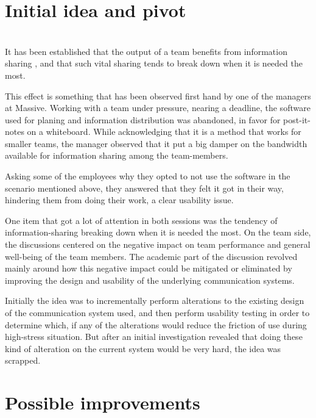 \section{Initial idea and pivot}

   \\
  It has been established that the output of a team benefits from information
  sharing\cite{%
  citeInformationSharingTeamPerformanceMeta,%
  citeContextualizedRelationshipBetweenKnowledgeSharingandPerformanceinSoftwareDevelopment%
  }
  , and that such vital sharing tends to break down when it is needed
  the most\cite{citeInformationSharingTeamPerformanceMeta}.

  This effect is something that has been observed first hand by one of the
  managers at Massive. Working with a team under pressure, nearing a deadline,
  the software used for planing and information distribution was abandoned, in
  favor for post-it-notes on a whiteboard. While acknowledging that it is a
  method that works for smaller teams, the manager observed that it put a big
  damper on the bandwidth available for information sharing among the
  team-members.

  Asking some of the employees why they opted to not use the software in the scenario
  mentioned above, they answered that they felt it got in their way, hindering
  them from doing their work, a clear usability issue.

  One item that got a lot of attention in both sessions was the tendency of
  information-sharing breaking down when it is needed the most. On the team
  side, the discussions centered on the negative impact on team performance and
  general well-being of the team members. The academic part of the discussion
  revolved mainly around how this negative impact could be mitigated or
  eliminated by improving the design and usability of the underlying
  communication systems.

  Initially the idea was to incrementally perform alterations to the existing
  design of the communication system used, and then perform usability testing in
  order to determine which, if any of the alterations would reduce the friction
  of use during high-stress situation. But after an initial investigation
  revealed that doing these kind of alteration on the current system would be
  very hard, the idea was scrapped.


\section{Possible improvements}

